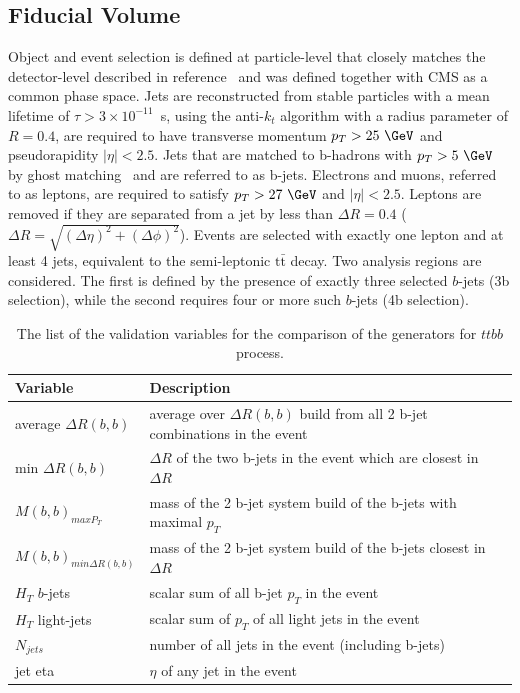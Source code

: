 \subsection{Fiducial Volume}
Object and event selection is defined at particle-level that closely matches the detector-level described in reference~\cite{HIGG-2017-03} and was defined together with CMS as a common phase space. Jets are reconstructed from stable particles with a mean lifetime of $\tau > 3\times 10^{-11}$~s, using the anti-$k_t$ algorithm with a radius parameter of $R=0.4$, are required to have transverse momentum $p_{T}>25~\GeV$ and pseudorapidity $|\eta|< 2.5$. Jets that are matched to b-hadrons with $p_{T}>5~\GeV$ by ghost matching~\cite{Cacciari:2008gn} and are referred to as b-jets. Electrons and muons, referred to as leptons, are required to satisfy $p_{T}>27~\GeV$ and $|\eta|< 2.5$. 
Leptons are removed if they are separated from a jet by less than $\Delta R=0.4$ ($\Delta R = \sqrt{(\Delta \eta )^2 + (\Delta \phi)^2}$).
Events are selected with exactly one lepton and at least 4 jets, equivalent to the semi-leptonic $\mathrm{t\bar{t}}$ decay.
Two analysis regions are considered. The first is defined by the presence of exactly three selected $b$-jets (3b selection), while the second requires four or more such $b$-jets (4b selection).


\begin{table}[]
\begin{center}
\caption{\label{tab:ttbb_varlist}
The list of the validation variables for the comparison of the generators for $ttbb$ process.}
\vspace{0.25cm}
{\small
\setlength\tabcolsep{1.5pt}
\begin{tabular}{l|l}
\hline\hline
Variable & Description  \\ \hline
average $\Delta R (b,b)$&    average over $\Delta R(b, b)$ build from all 2 b-jet combinations in the event           \\ 
min $\Delta R (b,b)$ &    $\Delta R$ of the two b-jets in the event which are closest in $\Delta R $          \\ 
$M (b,b)_{maxP_T}$ &      mass of the 2 b-jet system build of the b-jets with maximal $p_T$         \\ 
$M (b,b)_{min\Delta R(b,b)}$ &         mass of the 2 b-jet system build of the b-jets closest in $\Delta R $     \\ 
$H_T$  $b$-jets&           scalar sum of all b-jet $p_T$ in the event    \\ 
$H_T$ light-jets&        scalar sum of $p_T$ of all light jets in the event       \\ 
$N_{jets}$   &     number of all jets in the event (including b-jets)          \\ 
jet eta &          $\eta$ of any jet in the event     \\ 
    \hline\hline    
\end{tabular}
}
\end{center}
\end{table}




